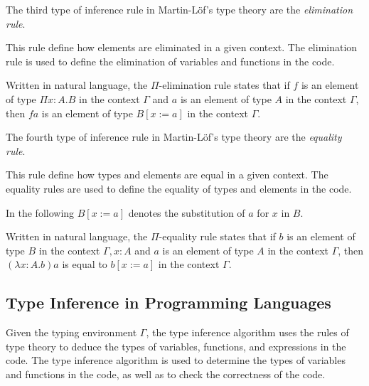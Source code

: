 The third type of inference rule in Martin-L\"of's type theory are the \textit{elimination rule}.
\begin{tcolorbox}[myboxstyle=black, title=Elimination Rule]
    This rule define how elements are eliminated in a given context. The elimination rule is used to define the elimination of variables and functions in the code.
    \begin{prooftree}
    \end{prooftree}
    \tcblower
    Written in natural language, the $\Pi$-elimination rule states that if $f$ is an element of type $\Pi x : A. B$ in the context $\Gamma$ and $a$ is an element of type $A$ in the context $\Gamma$, then $f a$ is an element of type $B[x := a]$ in the context $\Gamma$.
\end{tcolorbox}

The fourth type of inference rule in Martin-L\"of's type theory are the \textit{equality rule}.
\begin{tcolorbox}[myboxstyle=black, title=Equality Rule]
    This rule define how types and elements are equal in a given context. The equality rules are used to define the equality of types and elements in the code.

    In the following $B[x := a]$ denotes the substitution of $a$ for $x$ in $B$.
    \begin{prooftree}
    \end{prooftree}
    \tcblower
    Written in natural language, the $\Pi$-equality rule states that if $b$ is an element of type $B$ in the context $\Gamma, x : A$ and $a$ is an element of type $A$ in the context $\Gamma$, then $(\lambda x : A. b) a$ is equal to $b[x := a]$ in the context $\Gamma$.
\end{tcolorbox}

\subsection{Type Inference in Programming Languages}\label{subsubsec:background:TypeInferenceInProgrammingLanguages}

Given the typing environment $\Gamma$, the type inference algorithm uses the rules of type theory to deduce the types of variables, functions, and expressions in the code. The type inference algorithm is used to determine the types of variables and functions in the code, as well as to check the correctness of the code.

